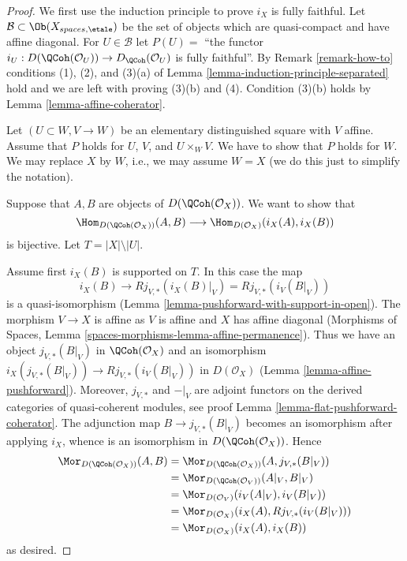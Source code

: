 \begin{proof}
We first use the induction principle to prove $i_X$ is fully faithful.
Let $\mathcal{B} \subset \Ob(X_{spaces, \etale})$ be the set of
objects which are quasi-compact and have affine diagonal.
For $U \in \mathcal{B}$ let $P(U) =$ ``the functor
$i_U : D(\QCoh(\mathcal{O}_U)) \to D_\QCoh(\mathcal{O}_U)$
is fully faithful''.
By Remark \ref{remark-how-to} conditions (1), (2), and (3)(a) of
Lemma \ref{lemma-induction-principle-separated} hold and we are
left with proving (3)(b) and (4). Condition (3)(b) holds by
Lemma \ref{lemma-affine-coherator}.

\medskip\noindent
Let $(U \subset W, V \to W)$ be an elementary distinguished square
with $V$ affine. Assume that $P$ holds for $U$, $V$, and $U \times_W V$.
We have to show that $P$ holds for $W$. We may replace $X$ by $W$, i.e.,
we may assume $W = X$ (we do this just to simplify the notation).

\medskip\noindent
Suppose that $A, B$ are objects of $D(\QCoh(\mathcal{O}_X))$.
We want to show that
$$
\Hom_{D(\QCoh(\mathcal{O}_X))}(A, B)
\longrightarrow
\Hom_{D(\mathcal{O}_X)}(i_X(A), i_X(B))
$$
is bijective. Let $T = |X| \setminus |U|$.

\medskip\noindent
Assume first $i_X(B)$ is supported on $T$. In this case the map
$$
i_X(B) \to Rj_{V, *}(i_X(B)|_V) = Rj_{V, *}(i_V(B|_V))
$$
is a quasi-isomorphism
(Lemma \ref{lemma-pushforward-with-support-in-open}).
The morphism $V \to X$ is affine as $V$ is affine and $X$ has affine diagonal
(Morphisms of Spaces, Lemma \ref{spaces-morphisms-lemma-affine-permanence}).
Thus we have an object $j_{V, *}(B|_V)$ in $\QCoh(\mathcal{O}_X)$
and an isomorphism
$i_X(j_{V, *}(B|_V)) \to Rj_{V, *}(i_V(B|_V))$ in $D(\mathcal{O}_X)$
(Lemma \ref{lemma-affine-pushforward}). Moreover, $j_{V, *}$ and
${-}|_V$ are adjoint functors on the derived categories of
quasi-coherent modules, see proof Lemma \ref{lemma-flat-pushforward-coherator}.
The adjunction map $B \to j_{V, *}(B|_V)$ becomes an isomorphism
after applying $i_X$, whence is an isomorphism in
$D(\QCoh(\mathcal{O}_X))$.
Hence
\begin{align*}
\Mor_{D(\QCoh(\mathcal{O}_X))}(A, B)
& =
\Mor_{D(\QCoh(\mathcal{O}_X))}(A, j_{V, *}(B|_V)) \\
& =
\Mor_{D(\QCoh(\mathcal{O}_V))}(A|_V, B|_V) \\
& =
\Mor_{D(\mathcal{O}_V)}(i_V(A|_V), i_V(B|_V)) \\
& =
\Mor_{D(\mathcal{O}_X)}(i_X(A), Rj_{V, *}(i_V(B|_V))) \\
& =
\Mor_{D(\mathcal{O}_X)}(i_X(A), i_X(B))
\end{align*}
as desired.


\end{proof}
